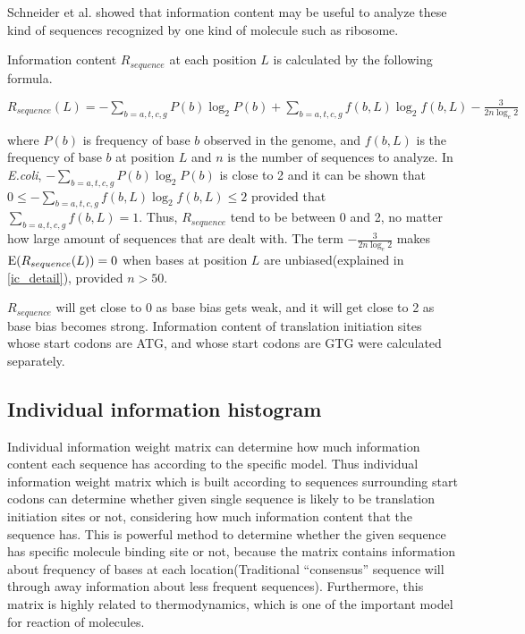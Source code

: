 Schneider et al.\cite{label11} showed that information content may be
useful to analyze these kind of sequences recognized by one kind of
molecule such as ribosome.

Information content \(R_{sequence}\) at each position \(L\) is
calculated by the following formula.

\vspace{1em}

\begin{math}
R_{sequence}(L) = -\sum_{b=a,t,c,g}P(b)\log_{2}P(b)
+ \sum_{b=a,t,c,g}f(b,L)\log_{2}f(b,L)
- \frac{3}{2n\log_{e}2} 
\end{math}

\vspace{1em}

\noindent
where \(P(b)\) is frequency of base \(b\) observed in the genome, and 
\(f(b,L)\) is the frequency of base \(b\) at position \(L\) and \(n\)
is the number of sequences to analyze. In {\it E.coli}, 
\(-\sum_{b=a,t,c,g}P(b)\log_{2}P(b)\) is close to 2 and it can be shown
that \(0 \leq -\sum_{b=a,t,c,g}f(b,L)\log_{2}f(b,L) \leq 2\) provided
that \(\sum_{b=a,t,c,g}f(b,L) = 1\).
Thus, \(R_{sequence}\) tend to be between 0 and 2, no matter how large 
amount of sequences that are dealt with. The term \(- \frac{3}{2n\log_{e}2}\) 
makes \({\rm E}(R_{sequence}(L)) = 0\) when bases at position \(L\) are
unbiased(explained in \ref{ic_detail}), provided \(n > 50\). 

\(R_{sequence}\) will get close to 0 as base bias gets weak, and it will
get close to 2 as base bias becomes strong. Information content of
translation initiation sites whose start codons are ATG, and whose start
codons are GTG were calculated separately.


\subsection{Individual information histogram}

Individual information weight matrix can determine how much
information content each sequence has according to the specific
model\cite{arclabelts200}. Thus individual information weight 
matrix which is built according to sequences surrounding start codons
can determine whether given single sequence is likely to be
translation initiation sites or not, considering how much information
content that the sequence has. This is powerful method to determine
whether the given sequence has specific molecule binding site or not,
because the matrix contains information about frequency of bases at
each location(Traditional ``consensus'' sequence will through away
information about less frequent sequences). Furthermore, this matrix
is highly related to thermodynamics, which is one of the important
model for reaction of molecules.

